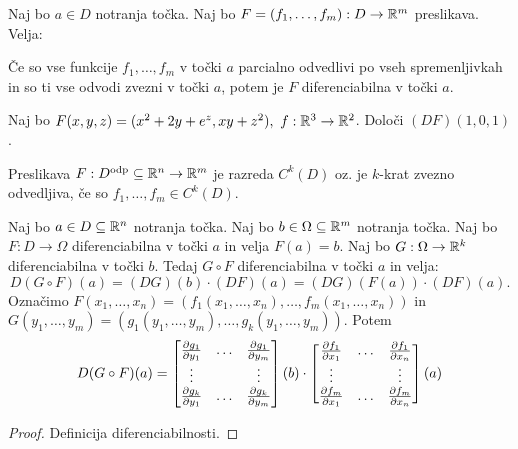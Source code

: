 \begin{posledica}
    Naj bo $a \in D$ notranja točka. Naj bo $F = (f_1, \ldots, f_m): D \to \mathbb{R}^m$ preslikava. Velja:
    
    Če so vse funkcije $f_1, \ldots, f_m$ v točki $a$ parcialno odvedlivi po vseh spremenljivkah in so ti vse odvodi zvezni v točki $a$, potem je $F$ diferenciabilna v točki $a$.
\end{posledica}

\begin{zgled}
    Naj bo $F(x,y,z) = (x^2+2y+e^z, xy+z^2), \ f: \RR^3 \to \RR^2$. Določi $(DF)(1,0,1)$.
\end{zgled}

\begin{opomba}
    Preslikava $F: D^{\text{odp}} \subseteq \mathbb{R}^n \to \mathbb{R}^m$ je razreda $C^k(D)$ oz. je $k$-krat zvezno odvedljiva, če so $f_1, \ldots, f_m \in C^k(D)$.
\end{opomba}

\begin{izrek}
    Naj bo $a \in D \subseteq \mathbb{R}^n$ notranja točka. Naj bo $b \in \Omega \subseteq \mathbb{R}^m$ notranja točka. Naj bo $F: D \to \Omega$ diferenciabilna v točki $a$ in velja $F(a) = b$. Naj bo $G: \Omega \to \mathbb{R}^k$ diferenciabilna v točki $b$. Tedaj $G \circ F$ diferenciabilna v točki $a$ in velja:
    $$D(G \circ F)(a) = (DG)(b) \cdot (DF)(a) = (DG)(F(a)) \cdot (DF)(a).$$
    Označimo $F(x_1, \ldots, x_n) = (f_1(x_1, \ldots, x_n), \ldots, f_m(x_1, \ldots, x_n))$ in $G(y_1, \ldots, y_m) = (g_1(y_1, \ldots, y_m), \ldots, g_k(y_1, \ldots, y_m))$. Potem 
    $$D(G \circ F)(a) = \begin{bmatrix}
        \frac{\partial g_1}{\partial y_1} & \ldots & \frac{\partial g_1}{\partial y_m} \\
        \vdots & & \vdots \\
        \frac{\partial g_k}{\partial y_1} & \ldots & \frac{\partial g_k}{\partial y_m}
    \end{bmatrix}(b) \cdot \begin{bmatrix}
        \frac{\partial f_1}{\partial x_1} & \ldots & \frac{\partial f_1}{\partial x_n} \\
        \vdots & & \vdots \\
        \frac{\partial f_m}{\partial x_1} & \ldots & \frac{\partial f_m}{\partial x_n}
    \end{bmatrix}(a)$$
\end{izrek}

\begin{proof}
    Definicija diferenciabilnosti.
\end{proof}

